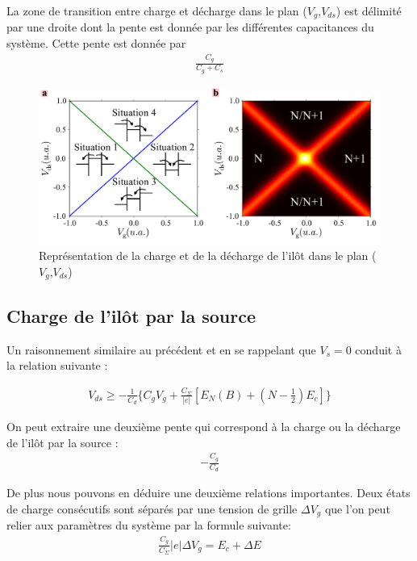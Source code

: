 La zone de transition entre charge et décharge dans le plan ($V_g$,$V_{ds}$) est délimité par une droite dont la pente est donnée par les différentes capacitances du système. Cette pente est donnée par 
\begin{eqnarray}
\frac{C_g}{C_g + C_s} \nonumber
\end{eqnarray}



\begin{figure}
\includegraphics[scale=0.5]{Theorie/Transport/figure3/figure3.pdf} 
\caption{Représentation de la charge et de la décharge de l'il\^ot dans le plan ($V_g$,$V_{ds}$)}
\label{charge_discharge}
\end{figure}



\subsection{Charge de l'il\^ot par la source}
Un raisonnement similaire au précédent et en se rappelant que $V_s = 0$ conduit à la relation suivante :

\begin{eqnarray}
V_{ds} \geq -\frac{1}{C_d} \{C_gV_g + \frac{C_{\Sigma}}{|e|}[E_N(B) + (N-\frac{1}{2})E_c] \}
\end{eqnarray}


On peut extraire une deuxième pente qui correspond à la charge ou la décharge de l'il\^ot par la source :
\begin{eqnarray}
-\frac{C_g}{C_d} \nonumber
\end{eqnarray}


De plus nous pouvons en déduire une deuxième relations importantes. Deux états de charge consécutifs sont séparés par une tension de grille $\Delta V_g$ que l'on peut relier aux paramètres du système par la formule suivante:
\begin{eqnarray}
\frac{C_g}{C_{\Sigma}} |e| \Delta V_g = E_c + \Delta E
\end{eqnarray}

